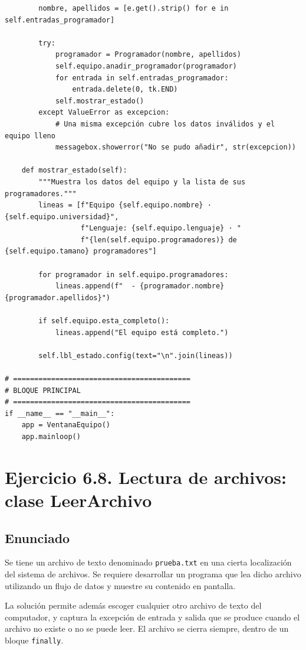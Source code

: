 \documentclass[11pt, a4paper]{article}
\begin{document}
\begin{lstlisting}
        nombre, apellidos = [e.get().strip() for e in self.entradas_programador]

        try:
            programador = Programador(nombre, apellidos)
            self.equipo.anadir_programador(programador)
            for entrada in self.entradas_programador:
                entrada.delete(0, tk.END)
            self.mostrar_estado()
        except ValueError as excepcion:
            # Una misma excepción cubre los datos inválidos y el equipo lleno
            messagebox.showerror("No se pudo añadir", str(excepcion))

    def mostrar_estado(self):
        """Muestra los datos del equipo y la lista de sus programadores."""
        lineas = [f"Equipo {self.equipo.nombre} · {self.equipo.universidad}",
                  f"Lenguaje: {self.equipo.lenguaje} · "
                  f"{len(self.equipo.programadores)} de {self.equipo.tamano} programadores"]

        for programador in self.equipo.programadores:
            lineas.append(f"  - {programador.nombre} {programador.apellidos}")

        if self.equipo.esta_completo():
            lineas.append("El equipo está completo.")

        self.lbl_estado.config(text="\n".join(lineas))

# ==========================================
# BLOQUE PRINCIPAL
# ==========================================
if __name__ == "__main__":
    app = VentanaEquipo()
    app.mainloop()
\end{lstlisting}

\newpage
\section{Ejercicio 6.8. Lectura de archivos: clase LeerArchivo}

\subsection{Enunciado}
Se tiene un archivo de texto denominado \texttt{prueba.txt} en una cierta localización del
sistema de archivos. Se requiere desarrollar un programa que lea dicho archivo utilizando un
flujo de datos y muestre su contenido en pantalla.

\medskip
\noindent La solución permite además escoger cualquier otro archivo de texto del computador, y
captura la excepción de entrada y salida que se produce cuando el archivo no existe o no se
puede leer. El archivo se cierra siempre, dentro de un bloque \texttt{finally}.
\end{document}
